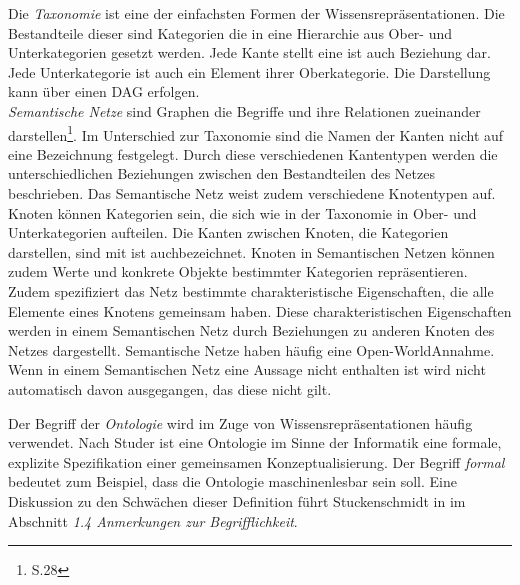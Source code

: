 Die \textit{Taxonomie} ist eine der einfachsten Formen der Wissensrepräsentationen. Die Bestandteile dieser sind Kategorien die in eine Hierarchie aus Ober- und Unterkategorien gesetzt werden. Jede Kante stellt eine \glqq ist auch \grqq Beziehung dar. Jede Unterkategorie ist auch ein Element ihrer Oberkategorie. Die Darstellung kann über einen DAG erfolgen.\\ %
\textit{Semantische Netze} \glqq sind Graphen die Begriffe und ihre Relationen zueinander darstellen\grqq\footnote{\cite{STU09} S.28}. Im Unterschied zur Taxonomie sind die Namen der Kanten nicht auf eine Bezeichnung festgelegt. Durch diese verschiedenen Kantentypen werden die unterschiedlichen Beziehungen zwischen den Bestandteilen des Netzes beschrieben. Das Semantische Netz weist zudem verschiedene Knotentypen auf. Knoten können Kategorien sein, die sich wie in der Taxonomie in Ober- und Unterkategorien aufteilen. Die Kanten zwischen Knoten, die Kategorien darstellen, sind mit \glqq ist auch\grqq bezeichnet. Knoten in Semantischen Netzen können zudem Werte und konkrete Objekte bestimmter Kategorien repräsentieren. Zudem spezifiziert das Netz bestimmte charakteristische Eigenschaften, die alle Elemente eines Knotens gemeinsam haben. Diese charakteristischen Eigenschaften werden in einem Semantischen Netz durch Beziehungen zu anderen Knoten des Netzes dargestellt. Semantische Netze haben häufig eine \glq Open-World\grq  Annahme. Wenn in einem Semantischen Netz eine Aussage nicht enthalten ist wird nicht automatisch davon ausgegangen, das diese nicht gilt.

Der Begriff der \textit{Ontologie} wird im Zuge von Wissensrepräsentationen häufig verwendet. Nach Studer \cite{STBEFE98} ist eine Ontologie im Sinne der Informatik eine \glqq formale, explizite Spezifikation einer gemeinsamen Konzeptualisierung\grqq. Der Begriff \textit{formal} bedeutet zum Beispiel, dass die Ontologie maschinenlesbar sein soll. Eine Diskussion zu den Schwächen dieser Definition führt Stuckenschmidt in \cite{STU09} im Abschnitt \textit{1.4 Anmerkungen zur Begrifflichkeit}. 
